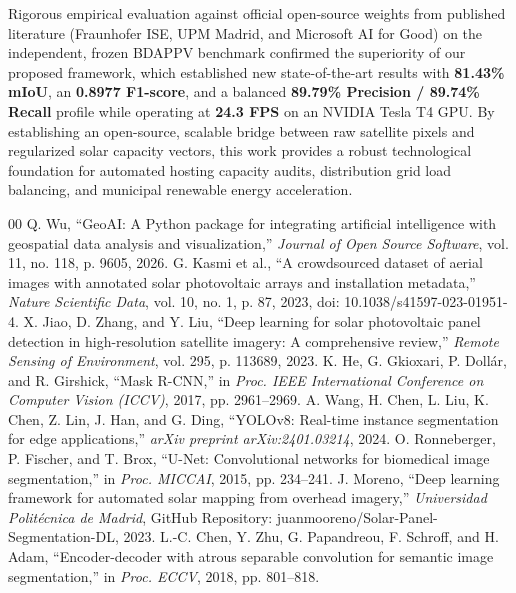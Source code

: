 \documentclass[conference]{IEEEtran}
\begin{document}
Rigorous empirical evaluation against official open-source weights from published literature (Fraunhofer ISE, UPM Madrid, and Microsoft AI for Good) on the independent, frozen BDAPPV benchmark confirmed the superiority of our proposed framework, which established new state-of-the-art results with \textbf{81.43\% mIoU}, an \textbf{0.8977 F1-score}, and a balanced \textbf{89.79\% Precision / 89.74\% Recall} profile while operating at \textbf{24.3 FPS} on an NVIDIA Tesla T4 GPU. By establishing an open-source, scalable bridge between raw satellite pixels and regularized solar capacity vectors, this work provides a robust technological foundation for automated hosting capacity audits, distribution grid load balancing, and municipal renewable energy acceleration.

\FloatBarrier

\begin{thebibliography}{00}
 Q. Wu, ``GeoAI: A Python package for integrating artificial intelligence with geospatial data analysis and visualization,'' \textit{Journal of Open Source Software}, vol. 11, no. 118, p. 9605, 2026.
 G. Kasmi et al., ``A crowdsourced dataset of aerial images with annotated solar photovoltaic arrays and installation metadata,'' \textit{Nature Scientific Data}, vol. 10, no. 1, p. 87, 2023, doi: 10.1038/s41597-023-01951-4.
 X. Jiao, D. Zhang, and Y. Liu, ``Deep learning for solar photovoltaic panel detection in high-resolution satellite imagery: A comprehensive review,'' \textit{Remote Sensing of Environment}, vol. 295, p. 113689, 2023.
 K. He, G. Gkioxari, P. Dollár, and R. Girshick, ``Mask R-CNN,'' in \textit{Proc. IEEE International Conference on Computer Vision (ICCV)}, 2017, pp. 2961--2969.
 A. Wang, H. Chen, L. Liu, K. Chen, Z. Lin, J. Han, and G. Ding, ``YOLOv8: Real-time instance segmentation for edge applications,'' \textit{arXiv preprint arXiv:2401.03214}, 2024.
 O. Ronneberger, P. Fischer, and T. Brox, ``U-Net: Convolutional networks for biomedical image segmentation,'' in \textit{Proc. MICCAI}, 2015, pp. 234--241.
 J. Moreno, ``Deep learning framework for automated solar mapping from overhead imagery,'' \textit{Universidad Politécnica de Madrid}, GitHub Repository: juanmooreno/Solar-Panel-Segmentation-DL, 2023.
 L.-C. Chen, Y. Zhu, G. Papandreou, F. Schroff, and H. Adam, ``Encoder-decoder with atrous separable convolution for semantic image segmentation,'' in \textit{Proc. ECCV}, 2018, pp. 801--818.

\end{thebibliography}
\end{document}
